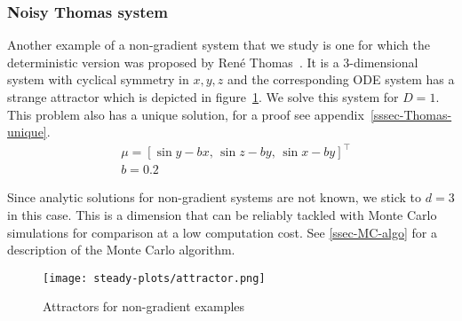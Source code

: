 \subsubsection{Noisy Thomas system}
Another example of a non-gradient system that we study is one for which the deterministic version was proposed by René Thomas~\cite{thomas1999deterministic}. It is a 3-dimensional system with cyclical symmetry in $x, y, z$ and the corresponding ODE system has a strange attractor which is depicted in figure~\ref{fig:attractors}.
We solve this system for $D=1$. This problem also has a unique solution, for a proof see appendix~\ref{sssec-Thomas-unique}.
\begin{align}
    &\mu=[\sin y - bx,\, \sin z - by,\, \sin x - by ]^\top\label{eq:mu-Thomas}\\
    &b =  0.2 
\end{align}

Since analytic solutions for non-gradient systems are not known, we stick to $d=3$ in this case. This is a dimension that can be reliably tackled with Monte Carlo simulations for comparison at a low computation cost. See \ref{ssec-MC-algo} for a description of the Monte Carlo algorithm.

\begin{figure}[!ht]
    \centering\texttt{[image: steady-plots/attractor.png]}
   \caption{Attractors for non-gradient examples} \label{fig:attractors}
\end{figure}

